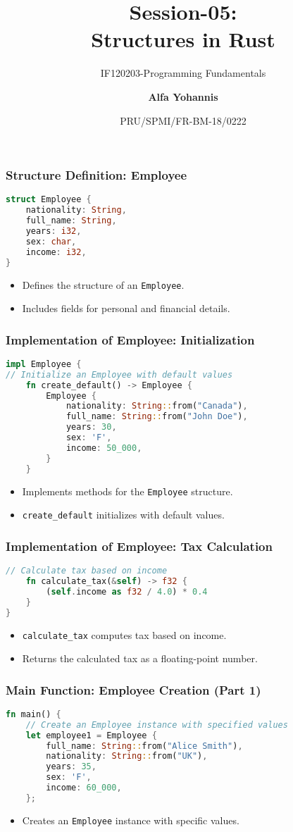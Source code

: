\documentclass[aspectratio=169, table]{beamer}
\subtitle{IF120203-Programming Fundamentals}
\title{Session-05:\\\LARGE{Structures in Rust}\\ \vspace{10pt}}
\date[Serial]{\scriptsize {PRU/SPMI/FR-BM-18/0222}}
\author[Pradita]{\small{\textbf{Alfa Yohannis}}}
\begin{document}
\frame{\titlepage}

\begin{frame}[fragile]
\frametitle{Structure Definition: Employee}
\begin{lstlisting}[language=Rust]
struct Employee {
	nationality: String,
	full_name: String,
	years: i32,
	sex: char,
	income: i32,
}
\end{lstlisting}
\begin{itemize}
\item Defines the structure of an \texttt{Employee}.
\item Includes fields for personal and financial details.
\end{itemize}
\end{frame}

\begin{frame}[fragile]
\frametitle{Implementation of Employee: Initialization}
\vspace{15pt}
\begin{lstlisting}[language=Rust]
impl Employee {
// Initialize an Employee with default values
	fn create_default() -> Employee {
		Employee {
			nationality: String::from("Canada"),
			full_name: String::from("John Doe"),
			years: 30,
			sex: 'F',
			income: 50_000,
		}
	}
\end{lstlisting}
\begin{itemize}
\item Implements methods for the \texttt{Employee} structure.
\item \texttt{create\_default} initializes with default values.
\end{itemize}
\end{frame}

\begin{frame}[fragile]
\frametitle{Implementation of Employee: Tax Calculation}
\begin{lstlisting}[language=Rust]
	// Calculate tax based on income
	fn calculate_tax(&self) -> f32 {
		(self.income as f32 / 4.0) * 0.4
	}
}
\end{lstlisting}
\begin{itemize}
\item \texttt{calculate\_tax} computes tax based on income.
\item Returns the calculated tax as a floating-point number.
\end{itemize}
\end{frame}

\begin{frame}[fragile]
\frametitle{Main Function: Employee Creation (Part 1)}
\vspace{20pt}
\begin{lstlisting}[language=Rust]
fn main() {
	// Create an Employee instance with specified values
	let employee1 = Employee {
		full_name: String::from("Alice Smith"),
		nationality: String::from("UK"),
		years: 35,
		sex: 'F',
		income: 60_000,
	};
\end{lstlisting}
\begin{itemize}
\item Creates an \texttt{Employee} instance with specific values.
\end{itemize}
\end{frame}
\end{document}
